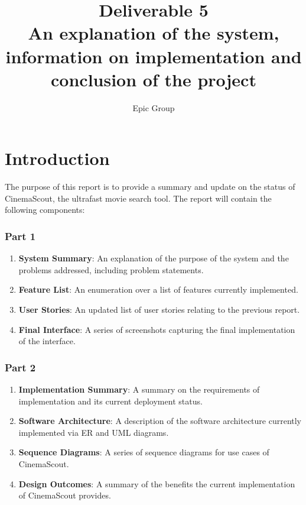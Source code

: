 \documentclass{article}
\begin{document}
\title{%
 Deliverable 5\\
 \large An explanation of the system, information on implementation and\\
 \large conclusion of the project
}
\author{Epic Group}
\date{}
\maketitle

\section*{Introduction}
The purpose of this report is to provide a summary and update on the status of
CinemaScout, the ultrafast movie search tool. The report will contain the following
components:
\subsubsection*{Part 1}
\begin{enumerate}
\item \textbf{System Summary}: An explanation of the purpose of the system
and the problems addressed, including problem statements.
\item \textbf{Feature List}: An enumeration over a list of features currently
implemented.
\item \textbf{User Stories}: An updated list of user stories relating to the
previous report.
\item \textbf{Final Interface}: A series of screenshots capturing the final
implementation of the interface.
\end{enumerate}
\subsubsection*{Part 2}
\begin{enumerate}
\item \textbf{Implementation Summary}: A summary on the requirements of
implementation and its current deployment status.
\item \textbf{Software Architecture}: A description of the software
architecture currently implemented via ER and UML diagrams.
\item \textbf{Sequence Diagrams}: A series of sequence diagrams for
use cases of CinemaScout.
\item \textbf{Design Outcomes}: A summary of the benefits the current 
implementation of CinemaScout provides.
\end{enumerate}
\end{document}

